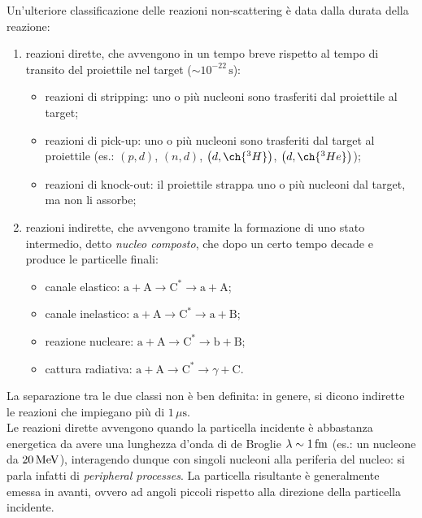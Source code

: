 Un'ulteriore classificazione delle reazioni non-scattering è data dalla durata della reazione:
\begin{enumerate}
	\item reazioni dirette, che avvengono in un tempo breve rispetto al tempo di transito del proiettile nel target ($ \sim 10^{-22}\,\text{s} $):
		\begin{itemize}
			\item reazioni di stripping: uno o più nucleoni sono trasferiti dal proiettile al target;
			\item reazioni di pick-up: uno o più nucleoni sono trasferiti dal target al proiettile (es.: $ \left( p,d \right) $, $ \left( n,d \right) $, $ \left( d,\ch{^3H} \right) $, $ \left( d,\ch{^3He} \right) $);
			\item reazioni di knock-out: il proiettile strappa uno o più nucleoni dal target, ma non li assorbe;
		\end{itemize}
	\item reazioni indirette, che avvengono tramite la formazione di uno stato intermedio, detto \textit{nucleo composto}, che dopo un certo tempo decade e produce le particelle finali:
		\begin{itemize}
			\item canale elastico: $ \mathrm{a} + \mathrm{A} \rightarrow \mathrm{C}^* \rightarrow \mathrm{a} + \mathrm{A} $;
			\item canale inelastico: $ \mathrm{a} + \mathrm{A} \rightarrow \mathrm{C}^* \rightarrow \mathrm{a} + \mathrm{B} $;
			\item reazione nucleare: $ \mathrm{a} + \mathrm{A} \rightarrow \mathrm{C}^* \rightarrow \mathrm{b} + \mathrm{B} $;
			\item cattura radiativa: $ \mathrm{a} + \mathrm{A} \rightarrow \mathrm{C}^* \rightarrow \gamma + \mathrm{C} $.
		\end{itemize}
\end{enumerate}
La separazione tra le due classi non è ben definita: in genere, si dicono indirette le reazioni che impiegano più di $ 1\,\mu\text{s} $.\\
Le reazioni dirette avvengono quando la particella incidente è abbastanza energetica da avere una lunghezza d'onda di de Broglie $ \lambda \sim 1\,\mathrm{fm} $ (es.: un nucleone da $ 20\,\mathrm{MeV} $), interagendo dunque con singoli nucleoni alla periferia del nucleo: si parla infatti di \textit{peripheral processes}. La particella risultante è generalmente emessa in avanti, ovvero ad angoli piccoli rispetto alla direzione della particella incidente.

